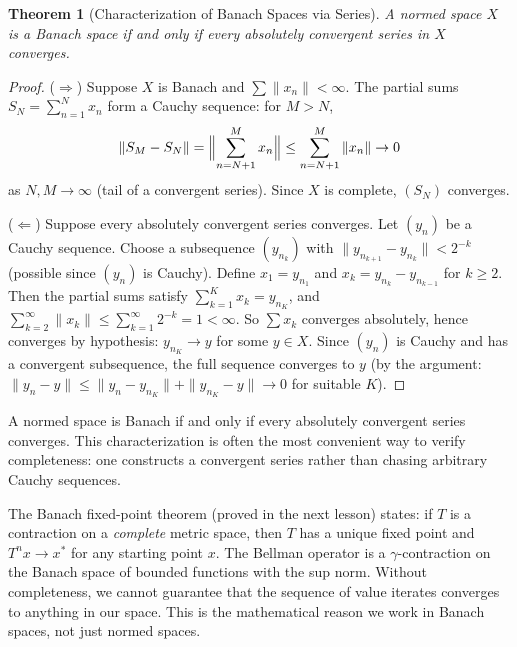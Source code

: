 \documentclass[11pt,a4paper]{article}
\theoremstyle{definition}
\theoremstyle{plain}
\newtheorem{theorem}{Theorem}[section]
\theoremstyle{remark}
\begin{document}
\begin{theorem}[Characterization of Banach Spaces via Series]
\label{thm:banach_series}
A normed space $X$ is a Banach space if and only if every absolutely convergent
series in $X$ converges.
\end{theorem}

\begin{proof}
($\Rightarrow$) Suppose $X$ is Banach and $\sum \|x_n\| < \infty$. The partial
sums $S_N = \sum_{n=1}^N x_n$ form a Cauchy sequence: for $M > N$,
\[
\|S_M - S_N\| = \Bigl\|\sum_{n=N+1}^M x_n\Bigr\| \le \sum_{n=N+1}^M \|x_n\| \to 0
\]
as $N, M \to \infty$ (tail of a convergent series). Since $X$ is complete, $(S_N)$
converges.

($\Leftarrow$) Suppose every absolutely convergent series converges. Let $(y_n)$
be a Cauchy sequence. Choose a subsequence $(y_{n_k})$ with
$\|y_{n_{k+1}} - y_{n_k}\| < 2^{-k}$ (possible since $(y_n)$ is Cauchy). Define
$x_1 = y_{n_1}$ and $x_k = y_{n_k} - y_{n_{k-1}}$ for $k \ge 2$. Then the partial
sums satisfy $\sum_{k=1}^K x_k = y_{n_K}$, and
$\sum_{k=2}^\infty \|x_k\| \le \sum_{k=1}^\infty 2^{-k} = 1 < \infty$. So
$\sum x_k$ converges absolutely, hence converges by hypothesis: $y_{n_K} \to y$ for
some $y \in X$. Since $(y_n)$ is Cauchy and has a convergent subsequence, the full
sequence converges to $y$ (by the argument: $\|y_n - y\| \le
\|y_n - y_{n_K}\| + \|y_{n_K} - y\| \to 0$ for suitable $K$).
\end{proof}

\begin{keyresult}
A normed space is Banach if and only if every absolutely convergent series
converges. This characterization is often the most convenient way to verify
completeness: one constructs a convergent series rather than chasing arbitrary
Cauchy sequences.
\end{keyresult}

\begin{rlconnection}
The Banach fixed-point theorem (proved in the next lesson) states: if $T$ is a
contraction on a \emph{complete} metric space, then $T$ has a unique fixed point
and $T^n x \to x^*$ for any starting point $x$. The Bellman operator is a
$\gamma$-contraction on the Banach space of bounded functions with the sup norm.
Without completeness, we cannot guarantee that the sequence of value iterates
converges to anything in our space. This is the mathematical reason we work in
Banach spaces, not just normed spaces.
\end{rlconnection}
\end{document}
